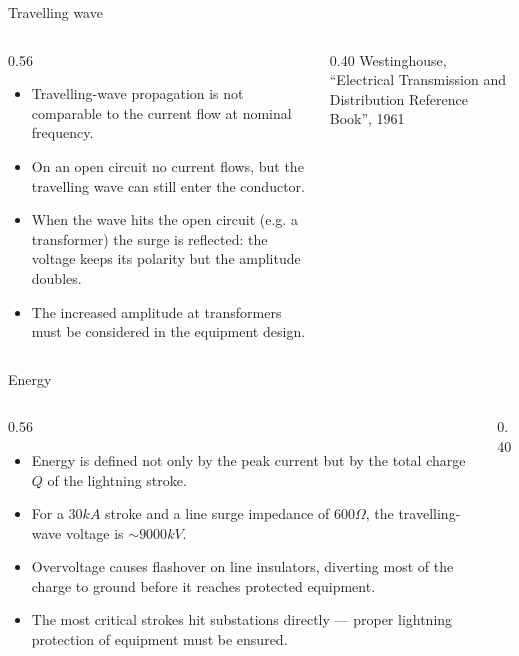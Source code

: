 \begin{frame}{Travelling wave}
  \begin{columns}[c,onlytextwidth]
    \begin{column}{0.56\textwidth}
      \begin{itemize}
        \setlength{\itemsep}{0.4em}
        \item Travelling-wave propagation is not comparable to the current
              flow at nominal frequency.
        \item On an open circuit no current flows, but the travelling wave
              can still enter the conductor.
        \item When the wave hits the open circuit (e.g. a transformer) the
              surge is reflected: the voltage keeps its polarity but the
              amplitude doubles.
        \item The increased amplitude at transformers must be considered in
              the equipment design.
      \end{itemize}
      \vspace{0.2em}
    \end{column}
    \begin{column}{0.40\textwidth}
      \centering
      {\color{atGray}\footnotesize Westinghouse, ``Electrical Transmission and Distribution Reference Book'', 1961}
    \end{column}
  \end{columns}
\end{frame}

\begin{frame}{Energy}
  \begin{columns}[c,onlytextwidth]
    \begin{column}{0.56\textwidth}
      \begin{itemize}
        \setlength{\itemsep}{0.35em}
        \item Energy is defined not only by the peak current but by the total
              charge $Q$ of the lightning stroke.
        \item For a $30 kA$ stroke and a line surge impedance of $600 \Omega$,
              the travelling-wave voltage is $\sim9000kV$.
        \item Overvoltage causes flashover on line insulators, diverting most
              of the charge to ground before it reaches protected equipment.
        \item The most critical strokes hit substations directly --- proper
              lightning protection of equipment must be ensured.
      \end{itemize}
    \end{column}
    \begin{column}{0.40\textwidth}
      \centering
    \end{column}
  \end{columns}
\end{frame}

